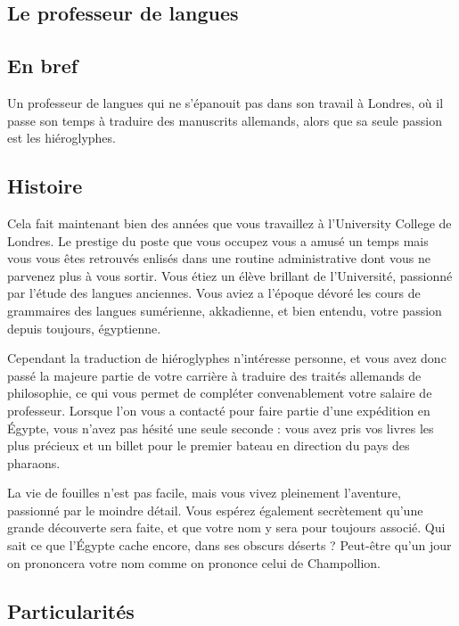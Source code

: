 \documentclass[11pt]{article}
\begin{document}
\begin{twocols}

\section{Le professeur de langues}
\label{sec:org6dc6e3c}
\subsection{En bref}
\label{sec:org6c88d09}

Un professeur de langues qui ne s'épanouit pas dans son travail à Londres, où il passe son temps à traduire des manuscrits allemands, alors que sa seule passion est les hiéroglyphes. 

\subsection{Histoire}
\label{sec:org1cbec2d}

Cela fait maintenant bien des années que vous travaillez à l'University College de Londres. Le prestige du poste que vous occupez vous a amusé un temps mais vous vous êtes retrouvés enlisés dans une routine administrative dont vous ne parvenez plus à vous sortir. Vous étiez un élève brillant de l'Université, passionné par l'étude des langues anciennes. Vous aviez a l'époque dévoré les cours de grammaires des langues sumérienne, akkadienne, et bien entendu, votre passion depuis toujours, égyptienne.

Cependant la traduction de hiéroglyphes n'intéresse personne, et vous avez donc passé la majeure partie de votre carrière à traduire des traités allemands de philosophie, ce qui vous permet de compléter convenablement votre salaire de professeur. Lorsque l'on vous a contacté pour faire partie d'une expédition en Égypte, vous n'avez pas hésité une seule seconde : vous avez pris vos livres les plus précieux et un billet pour le premier bateau en direction du pays des pharaons.

La vie de fouilles n'est pas facile, mais vous vivez pleinement l'aventure, passionné par le moindre détail. Vous espérez également secrètement qu'une grande découverte sera faite, et que votre nom y sera pour toujours associé. Qui sait ce que l'Égypte cache encore, dans ses obscurs déserts ? Peut-être qu'un jour on prononcera votre nom comme on prononce celui de Champollion. 

\subsection{Particularités}
\label{sec:orgdec9406}


\end{twocols}
\end{document}
